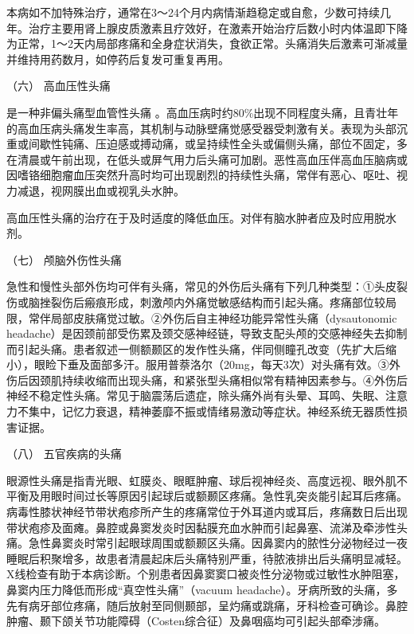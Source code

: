 本病如不加特殊治疗，通常在3～24个月内病情渐趋稳定或自愈，少数可持续几年。治疗主要用肾上腺皮质激素且疗效好，在激素开始治疗后数小时内体温即下降为正常，1～2天内局部疼痛和全身症状消失，食欲正常。头痛消失后激素可渐减量并维持用药数月，如停药后复发可重复再用。

\hypertarget{text00020.htmlux5cux23CHP1-7-4-6}{}
（六） 高血压性头痛

是一种非偏头痛型血管性头痛
。高血压病时约80\%出现不同程度头痛，且青壮年的高血压病头痛发生率高，其机制与动脉壁痛觉感受器受刺激有关。表现为头部沉重或间歇性钝痛、压迫感或搏动痛，或呈持续性全头或偏侧头痛，部位不固定，多在清晨或午前出现，在低头或屏气用力后头痛可加剧。恶性高血压伴高血压脑病或因嗜铬细胞瘤血压突然升高时均可出现剧烈的持续性头痛，常伴有恶心、呕吐、视力减退，视网膜出血或视乳头水肿。

高血压性头痛的治疗在于及时适度的降低血压。对伴有脑水肿者应及时应用脱水剂。

\hypertarget{text00020.htmlux5cux23CHP1-7-4-7}{}
（七） 颅脑外伤性头痛

急性和慢性头部外伤均可伴有头痛，常见的外伤后头痛有下列几种类型：①头皮裂伤或脑挫裂伤后瘢痕形成，刺激颅内外痛觉敏感结构而引起头痛。疼痛部位较局限，常伴局部皮肤痛觉过敏。②外伤后自主神经功能异常性头痛（dysautonomic
headache）是因颈前部受伤累及颈交感神经链，导致支配头颅的交感神经失去抑制而引起头痛。患者叙述一侧额颞区的发作性头痛，伴同侧瞳孔改变（先扩大后缩小），眼睑下垂及面部多汗。服用普萘洛尔（20mg，每天3次）对头痛有效。③外伤后因颈肌持续收缩而出现头痛，和紧张型头痛相似常有精神因素参与。④外伤后神经不稳定性头痛。常见于脑震荡后遗症，除头痛外尚有头晕、耳鸣、失眠、注意力不集中，记忆力衰退，精神萎靡不振或情绪易激动等症状。神经系统无器质性损害证据。

\hypertarget{text00020.htmlux5cux23CHP1-7-4-8}{}
（八） 五官疾病的头痛

眼源性头痛是指青光眼、虹膜炎、眼眶肿瘤、球后视神经炎、高度远视、眼外肌不平衡及用眼时间过长等原因引起球后或额颞区疼痛。急性乳突炎能引起耳后疼痛。病毒性膝状神经节带状疱疹所产生的疼痛常位于外耳道内或耳后，疼痛数日后出现带状疱疹及面瘫。鼻腔或鼻窦发炎时因黏膜充血水肿而引起鼻塞、流涕及牵涉性头痛。急性鼻窦炎时常引起眼球周围或额颞区头痛。因鼻窦内的脓性分泌物经过一夜睡眠后积聚增多，故患者清晨起床后头痛特别严重，待脓液排出后头痛明显减轻。X线检查有助于本病诊断。个别患者因鼻窦窦口被炎性分泌物或过敏性水肿阻塞，鼻窦内压力降低而形成“真空性头痛”（vacuum
headache）。牙病所致的头痛，多先有病牙部位疼痛，随后放射至同侧颞部，呈灼痛或跳痛，牙科检查可确诊。鼻腔肿瘤、颞下颌关节功能障碍（Costen综合征）及鼻咽癌均可引起头部牵涉痛。

